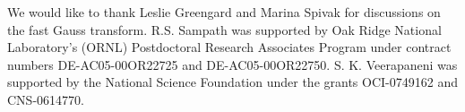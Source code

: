We would like to thank Leslie Greengard and Marina Spivak for discussions on the fast Gauss transform. 
R.S. Sampath was supported by Oak Ridge National Laboratory's (ORNL) Postdoctoral Research Associates Program 
under contract numbers DE-AC05-00OR22725 and DE-AC05-00OR22750. S. K. Veerapaneni was supported by the National Science
 Foundation under the grants OCI-0749162 and CNS-0614770.
